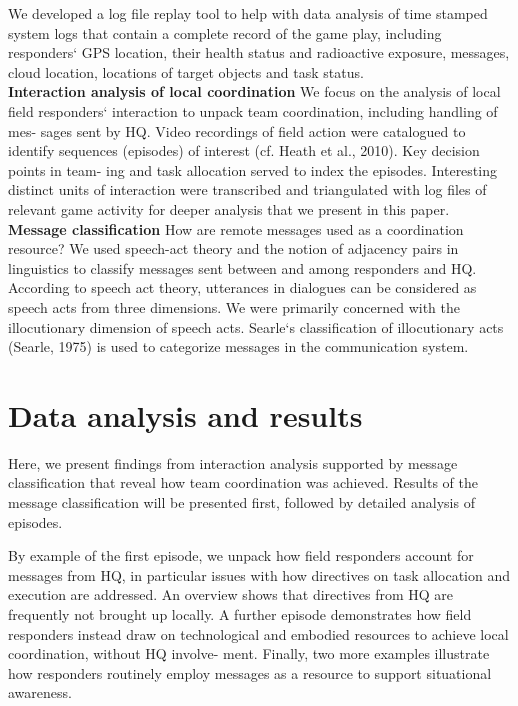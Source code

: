 We developed a log file replay tool to help with data analysis of time stamped system logs that contain a complete record of the game play, including responders` GPS location, their health status and radioactive exposure, messages, cloud location, locations of target objects and task status.\\

\textbf{Interaction analysis of local coordination} We focus on the analysis of local field responders` interaction to unpack team coordination, including handling of mes- sages sent by HQ. Video recordings of field action were catalogued to identify sequences (episodes) of interest (cf. Heath et al., 2010). Key decision points in team- ing and task allocation served to index the episodes. Interesting distinct units of interaction were transcribed and triangulated with log files of relevant game activity for deeper analysis that we present in this paper.\\

\textbf{Message classification} How are remote messages used as a coordination resource? We used speech-act theory and the notion of adjacency pairs in linguistics to classify messages sent between and among responders and HQ.\\

According to speech act theory, utterances in dialogues can be considered as speech acts from three dimensions. We were primarily concerned with the illocutionary dimension of speech acts. Searle`s classification of illocutionary acts (Searle, 1975) is used to categorize messages in the communication system.\\


\section{Data analysis and results}
Here, we present findings from interaction analysis supported by message classification that reveal how team coordination was achieved. Results of the message classification will be presented first, followed by detailed analysis of episodes. 

By example of the first episode, we unpack how field responders account for messages from HQ, in particular issues with how directives on task allocation and execution are addressed. An overview shows that directives from HQ are frequently not brought up locally. A further episode demonstrates how field responders instead draw on technological and embodied resources to achieve local coordination, without HQ involve- ment. Finally, two more examples illustrate how responders routinely employ messages as a resource to support situational awareness.\\

